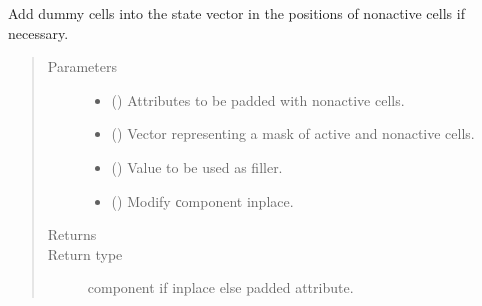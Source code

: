 \documentclass[letterpaper,10pt,english]{sphinxmanual}
\begin{document}
\begin{fulllineitems}
\begin{fulllineitems}
\label{\detokenize{api/states:geology.src.States.pad_na}}
Add dummy cells into the state vector in the positions of non\sphinxhyphen{}active cells if necessary.
\begin{quote}\begin{description}
\item[{Parameters}] \leavevmode\begin{itemize}
\item {} 
 (\sphinxstyleliteralemphasis{\sphinxupquote{, }}) \textendash{} Attributes to be padded with non\sphinxhyphen{}active cells.

\item {} 
 () \textendash{} Vector representing a mask of active and non\sphinxhyphen{}active cells.

\item {} 
 () \textendash{} Value to be used as filler.

\item {} 
 () \textendash{} Modify сomponent inplace.

\end{itemize}

\item[{Returns}] \leavevmode
{}

\item[{Return type}] \leavevmode
component if inplace else padded attribute.

\end{description}\end{quote}

\end{fulllineitems}


\end{fulllineitems}
\end{document}
